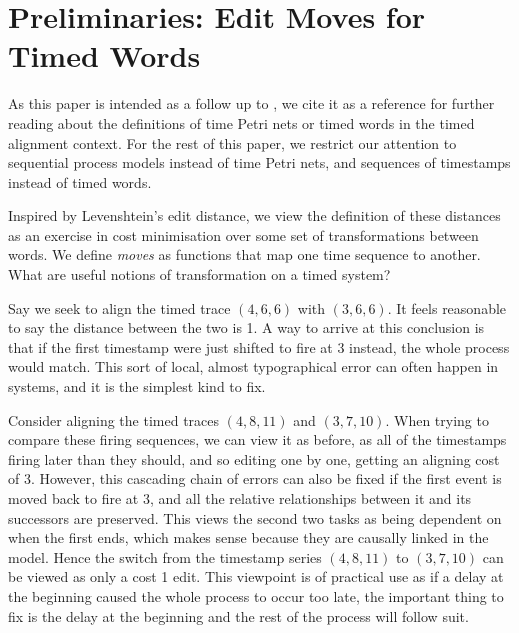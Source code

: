 \documentclass[runningheads]{llncs}
\begin{document}
    \section{Preliminaries: Edit Moves for Timed Words}
    \label{2}
    
As this paper is intended as a follow up to \cite{CR22}, we cite it as a reference for further reading about the definitions of time Petri nets or timed words in the timed alignment context. For the rest of this paper, we restrict our attention to sequential process models instead of time Petri nets, and sequences of timestamps instead of timed words. 

Inspired by Levenshtein's edit distance, we view the definition of these distances as an exercise in cost minimisation over some set of transformations between words. 
    We define \textit{moves} as functions that map one time sequence to another. 
    What are useful notions of transformation on a timed system? 

    \begin{example}
        Say we seek to align the timed trace $(4,6,6)$ with $(3, 6, 6)$. 
        It feels reasonable to say the distance between the two is 1. 
        A way to arrive at this conclusion is that if the first timestamp were just shifted to fire at 3 instead, the whole process would match. 
        This sort of local, almost typographical error can often happen in systems, and it is the simplest kind to fix.  
        
        Consider aligning the timed traces $(4, 8, 11)$ and $(3, 7, 10)$. 
        When trying to compare these firing sequences, we can view it as before, as all of the timestamps firing later than they should, and so editing one by one, getting an aligning cost of 3. 
        However, this cascading chain of errors can also be fixed if the first event is moved back to fire at 3, and all the relative relationships between it and its successors are preserved. 
        This views the second two tasks as being dependent on when the first ends, which makes sense because they are causally linked in the model. 
        Hence the switch from the timestamp series $(4, 8, 11)$ to $(3, 7, 10)$ can be viewed as only a cost 1 edit. 
        This viewpoint is of practical use as if a delay at the beginning caused the whole process to occur too late, the important thing to fix is the delay at the beginning and the rest of the process will follow suit. 
    \end{example}
    
\end{document}

